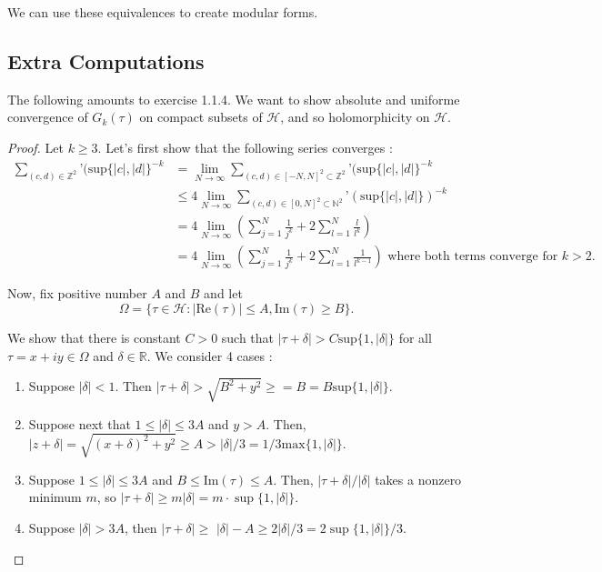 \documentclass[11pt]{article}
\theoremstyle{definition}
\theoremstyle{example}
\theoremstyle{remark}
\theoremstyle{lemma}
\theoremstyle{proposition}
\theoremstyle{Problem}
\theoremstyle{Solution}
\theoremstyle{theorem}
\theoremstyle{corollary}
\begin{document}
We can use these equivalences to create modular forms.


\subsection{Extra Computations}
The following amounts to exercise 1.1.4.
We want to show absolute and uniforme convergence of $G_k(\tau)$ on compact subsets of $\mathcal{H}$, and so holomorphicity on $\mathcal{H}$. 
\begin{proof}
Let $k\geq 3$. Let’s first show that the following series converges :
\begin{align*}
\sum_{(c,d)\in\mathbb{Z}^2}’(\mathrm{sup}\{|c|,|d|\}^{-k}&=\lim_{N\to\infty} \sum_{(c,d)\in [-N,N]^2\subset \mathbb Z^2}’(\mathrm{sup}\{|c|,|d|\}^{-k}\\
&\leq 4 \lim_{N\to \infty} \sum_{(c,d)\in [0,N]^2\subset \mathbb{N}^2}’(\mathrm{sup}\{|c|,|d|\})^{-k}\\
&=4\lim_{N\to \infty} (\sum_{j=1}^{N} \frac{1}{j^k}+2\sum_{l=1}^N \frac{l}{l^k})\\
&=4\lim_{N\to \infty} (\sum_{j=1}^{N} \frac{1}{j^k}+2\sum_{l=1}^N \frac{1}{l^{k-1}}) \text{ where both terms converge for }k>2. 
\end{align*}

Now, fix positive number $A$ and $B$ and let $$\Omega=\{ \tau \in \mathcal H : |\mathrm{Re}(\tau)|\leq A, \mathrm{Im}(\tau) \geq B\}.$$

We show that there is constant $C>0$ such that $|\tau+\delta|>C\mathrm{sup}\{ 1, |\delta |\}$ for all $\tau=x+iy \in \Omega$ and $\delta \in \mathbb R$. We consider 4 cases : 
\begin{enumerate}
\item Suppose $|\delta| <1$. Then $|\tau+\delta|>\sqrt{B^2+y^2}\geq = B=B\mathrm{sup}\{ 1, |\delta |\}$.

\item Suppose next that $1 \leq |\delta| \leq 3 A$ and $y>A$. Then, $|z+\delta| = \sqrt{(x+\delta)^2+y^2}\geq A > |\delta|/3 = 1/3 \mathrm{max}\{1, |\delta|\}.$

\item Suppose $1 \leq|\delta| \leq 3 A$ and $B \leq \mathrm{Im}(\tau) \leq A$. Then, $|\tau+\delta| /|\delta|$ takes a nonzero minimum $m$, so $|\tau+\delta| \geq m|\delta|=m \cdot \sup \{1,|\delta|\}$. 

\item Suppose $|\delta|>3 A$, then $|\tau+\delta| \geq$ $|\delta|-A \geq 2|\delta| / 3=2 \sup \{1,|\delta|\} / 3$. 


\end{enumerate}
\end{proof}
\end{document}
